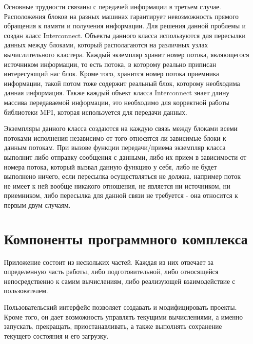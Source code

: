 \documentclass[a4paper, 14pt]{article}
\theoremstyle{definition}
\begin{document}
\par Основные трудности связаны с передачей информации в третьем случае. Расположения блоков на разных машинах гарантирует невозможность прямого обращения к памяти и получения информации. Для решения данной проблемы и создан класс Interconnect. Объекты данного класса используются для пересылки данных между блоками, который располагаются на различных узлах вычислительного кластера. Каждый экземпляр хранит номер потока, являющегося источником информации, то есть потока, в которому реально приписан интересующий нас блок. Кроме того, хранится номер потока приемника информации, такой потом тоже содержит реальный блок, которому необходима данная информация. Также каждый объект класса Interconnect знает длину массива передаваемой информации, это необходимо для корректной работы библиотеки MPI, которая используется для передачи данных.
\par Экземпляры данного класса создаются на каждую связь между блоками всеми потоками исполнения независимо от того относятся ли зависимые блоки к данным потокам. При вызове функции передачи/приема экземпляр класса выполнит либо отправку сообщения с данными, либо их прием в зависимости от номера потока, который вызвал данную функцию у себя, либо не будет выполнено ничего, если пересылка осуществляться не должна, например поток не имеет к ней вообще никакого отношения, не является ни источником, ни приемником, либо пересылка для данной связи не требуется - она относится к первым двум случаям.


\newpage
\section{Компоненты программного комплекса}

\par Приложение состоит из нескольких частей. Каждая из них отвечает за определенную часть работы, либо подготовительной, либо относящейся непосредственно к самим вычислениям, либо реализующей взаимодействие с пользователем.

\par Пользовательский интерфейс позволяет создавать и модифицировать проекты. Кроме того, он дает возможность управлять текущими вычислениями, а именно запускать, прекращать, приостанавливать, а также выполнять сохранение текущего состояния и его загрузку.
\end{document}
